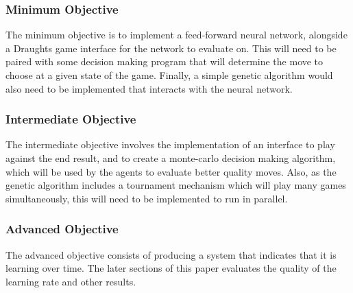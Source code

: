 \documentclass[12pt,a4paper]{article}
\begin{document}
    \subsubsection*{Minimum Objective}
        The minimum objective is to implement a feed-forward neural network, alongside a Draughts game interface for the network to evaluate on. This will need to be paired with some decision making program that will determine the move to choose at a given state of the game. Finally, a simple genetic algorithm would also need to be implemented that interacts with the neural network.

    \subsubsection*{Intermediate Objective}
        The intermediate objective involves the implementation of an interface to play against the end result, and to create a monte-carlo decision making algorithm, which will be used by the agents to evaluate better quality moves. Also, as the genetic algorithm includes a tournament mechanism which will play many games simultaneously, this will need to be implemented to run in parallel.
        
    \subsubsection*{Advanced Objective}
        The advanced objective consists of producing a system that indicates that it is learning over time. The later sections of this paper evaluates the quality of the learning rate and other results. 
    
\end{document}
